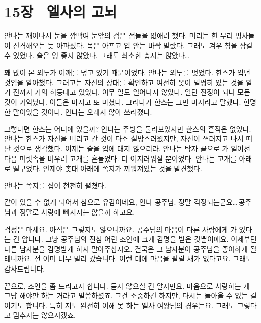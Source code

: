 

\chapter[15장  엘사의 고뇌][15장\hspace*{.5em}엘사의 고뇌]{15장 \ 엘사의 고뇌}



안나는 깨어나서 눈을 깜빡여 눈앞의 검은 점들을 없애려 했다. 머리는 한 무리 병사들이 진격해오는 듯 아파졌다. 목은 아프고 입 안는 바싹 말랐다. 그래도 겨우 침을 삼킬 수 있었다. 술은 영 좋지 않았다. 그래도 최소한 춥지는 않았다\ldots

꽤 많이 본 외투가 어깨를 덮고 있기 때문이었다. 안나는 외투를 벗었다. 한스가 입던 것임을 알아챘다. 그러고는 자신의 상태를 확인하고 여전히 옷이 멀쩡히 있는 것을 알기 전까지 거의 허둥대고 있었다. 이무 일도 일어나지 않았다. 일단 진정이 되니 모든 것이 기억났다. 이들은 마시고 또 마셨다. 그러다가 한스는 그만 마시라고 말했다. 현명한 말이었을 것이다. 안나는 오래지 않아 쓰러졌다.

그렇다면 한스는 어디에 있을까? 안나는 주방을 둘러보았지만 한스의 흔적은 없었다. 안나는 한스가 자신을 버리고 간 것이 다소 실망스러웠지만, 자신이 쓰러지고 나서 떠난 것으로 생각했다. 이제는 술을 입에 대지 않으리라. 안나는 탁자 끝으로 가 일어선 다음 머릿속을 비우려 고개를 흔들었다. 더 어지러워질 뿐이었다. 안나는 고개를 아래로 떨구었다. 인제야 촛대 아래에 쪽지가 끼워져있는 것을 발견했다.

안나는 쪽지를 집어 천천히 펼쳤다.\begin{letter}

같이 있을 수 없게 되어서 참으로 유감이네요, 안나 공주님. 정말 걱정되는군요\ldots\,공주님과 정말로 사랑에 빠지지는 않을까 하고요.

걱정은 마세요. 아직은 그렇지도 않으니까요. 공주님의 마음이 다른 사람에게 가 있다는 건 압니다. 그냥 공주님의 진심 어린 조언에 크게 감명을 받은 것뿐이에요. 이제부턴 다른 남자분을 감명받게 하지 말아주십시오. 결국은 그 남자분이 공주님을 좋아하게 될 테니까요. 전 이미 너무 멀리 갔습니다. 이런 데에 마음을 팔릴 새가 없다고요. 그래도 감사드립니다.

끝으로, 조언을 좀 드리고자 합니다. 듣지 않으실 건 알지만요. 마음으로 사랑하는 게 그냥 해야만 하는 거라고 말씀하셨죠. 그건 소중하긴 하지만, 다시는 돌아올 수 없는 길이기도 합니다. 특히 저도 완전히 이해 못 하는 엘사 여왕님의 경우는요. 그래도 그렇다고 멈추지는 않으시겠죠.

\end{letter}

